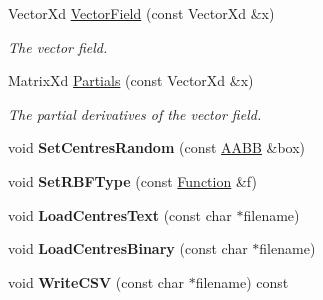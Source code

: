 \begin{DoxyCompactItemize}
\item 
\hypertarget{struct_d_r_d_s_p_1_1_model_r_b_f_a368c91d7df8ea3c0183dac748526e44c}{Vector\-Xd \hyperlink{struct_d_r_d_s_p_1_1_model_r_b_f_a368c91d7df8ea3c0183dac748526e44c}{Vector\-Field} (const Vector\-Xd \&x)}\label{struct_d_r_d_s_p_1_1_model_r_b_f_a368c91d7df8ea3c0183dac748526e44c}

\begin{DoxyCompactList}\small\item\em The vector field. \end{DoxyCompactList}\item 
\hypertarget{struct_d_r_d_s_p_1_1_model_r_b_f_a926c68bffcc90d16e5000659846e7a61}{Matrix\-Xd \hyperlink{struct_d_r_d_s_p_1_1_model_r_b_f_a926c68bffcc90d16e5000659846e7a61}{Partials} (const Vector\-Xd \&x)}\label{struct_d_r_d_s_p_1_1_model_r_b_f_a926c68bffcc90d16e5000659846e7a61}

\begin{DoxyCompactList}\small\item\em The partial derivatives of the vector field. \end{DoxyCompactList}\item 
\hypertarget{struct_d_r_d_s_p_1_1_model_r_b_f_a09e9a5e98036cdc2afa0efeee79120fe}{void {\bfseries Set\-Centres\-Random} (const \hyperlink{struct_d_r_d_s_p_1_1_a_a_b_b}{A\-A\-B\-B} \&box)}\label{struct_d_r_d_s_p_1_1_model_r_b_f_a09e9a5e98036cdc2afa0efeee79120fe}

\item 
\hypertarget{struct_d_r_d_s_p_1_1_model_r_b_f_a5e71e8da6a59afb2e84a5474c4eafc15}{void {\bfseries Set\-R\-B\-F\-Type} (const \hyperlink{struct_d_r_d_s_p_1_1_function}{Function} \&f)}\label{struct_d_r_d_s_p_1_1_model_r_b_f_a5e71e8da6a59afb2e84a5474c4eafc15}

\item 
\hypertarget{struct_d_r_d_s_p_1_1_model_r_b_f_ad08c2b2bb4ef5e2568b864d07a881591}{void {\bfseries Load\-Centres\-Text} (const char $\ast$filename)}\label{struct_d_r_d_s_p_1_1_model_r_b_f_ad08c2b2bb4ef5e2568b864d07a881591}

\item 
\hypertarget{struct_d_r_d_s_p_1_1_model_r_b_f_a5fba4f6a427ec8359e81926aa9e4a58d}{void {\bfseries Load\-Centres\-Binary} (const char $\ast$filename)}\label{struct_d_r_d_s_p_1_1_model_r_b_f_a5fba4f6a427ec8359e81926aa9e4a58d}

\item 
\hypertarget{struct_d_r_d_s_p_1_1_model_r_b_f_a04accc1f2dfafb57beef56fb8f845b48}{void {\bfseries Write\-C\-S\-V} (const char $\ast$filename) const }\label{struct_d_r_d_s_p_1_1_model_r_b_f_a04accc1f2dfafb57beef56fb8f845b48}

\end{DoxyCompactItemize}

